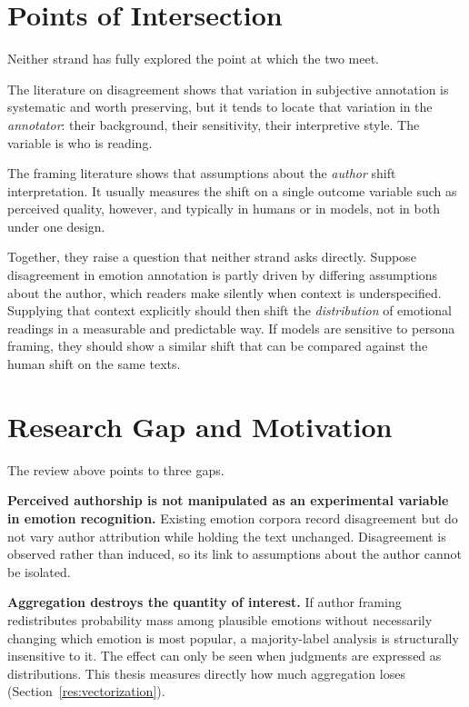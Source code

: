 \section{Points of Intersection}
\label{lit:intersection}

\noindent
Neither strand has fully explored the point at which the two meet.

The literature on disagreement shows that variation in subjective annotation is systematic and
worth preserving, but it tends to locate that variation in the \emph{annotator}: their
background, their sensitivity, their interpretive style. The variable is who is reading.

The framing literature shows that assumptions about the \emph{author} shift interpretation.
It usually measures the shift on a single outcome variable such as perceived quality, however,
and typically in humans or in models, not in both under one design.

Together, they raise a question that neither strand asks directly. Suppose disagreement in
emotion annotation is partly driven by differing assumptions about the author, which readers make
silently when context is underspecified. Supplying that context explicitly should then shift the
\emph{distribution} of emotional readings in a measurable and predictable way. If models are
sensitive to persona framing, they should show a similar shift that can be compared against the
human shift on the same texts.

\section{Research Gap and Motivation}
\label{lit:gap}

\noindent
The review above points to three gaps.

\textbf{Perceived authorship is not manipulated as an experimental variable in emotion
recognition.} Existing emotion corpora record disagreement but do not vary author attribution
while holding the text unchanged. Disagreement is observed rather than induced, so its link to
assumptions about the author cannot be isolated.

\textbf{Aggregation destroys the quantity of interest.} If author framing redistributes
probability mass among plausible emotions without necessarily changing which emotion is most
popular, a majority-label analysis is structurally insensitive to it. The effect can only be seen
when judgments are expressed as distributions. This thesis measures directly how much aggregation
loses (Section~\ref{res:vectorization}).

